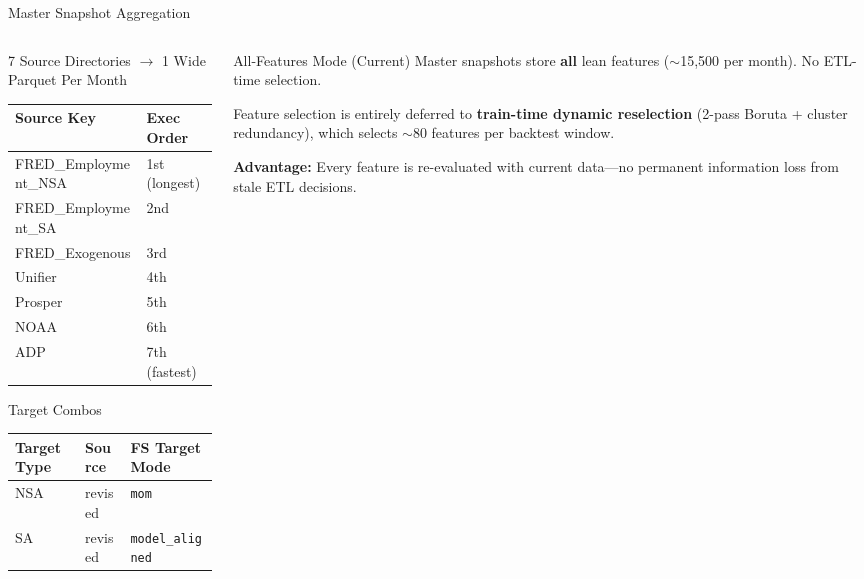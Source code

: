 \documentclass[aspectratio=169,10pt]{beamer}
\begin{document}
\begin{frame}{Master Snapshot Aggregation}
\begin{columns}[T]
\begin{column}{0.52\textwidth}
\begin{block}{7 Source Directories $\to$ 1 Wide Parquet Per Month}
\scriptsize
\begin{tabular}{@{}ll@{}}
\toprule
\textbf{Source Key} & \textbf{Exec Order} \\
\midrule
FRED\_Employment\_NSA & 1st (longest) \\
FRED\_Employment\_SA & 2nd \\
FRED\_Exogenous & 3rd \\
Unifier & 4th \\
Prosper & 5th \\
NOAA & 6th \\
ADP & 7th (fastest) \\
\bottomrule
\end{tabular}
\end{block}

\vspace{0.1cm}
\begin{block}{Target Combos}
\footnotesize
\begin{tabular}{@{}lll@{}}
\toprule
\textbf{Target Type} & \textbf{Source} & \textbf{FS Target Mode} \\
\midrule
NSA & revised & \texttt{mom} \\
SA & revised & \texttt{model\_aligned} \\
\bottomrule
\end{tabular}
\end{block}
\end{column}
\begin{column}{0.45\textwidth}
\begin{block}{All-Features Mode (Current)}
\footnotesize
Master snapshots store \textbf{all} lean features ($\sim$15{,}500 per month). No ETL-time selection.

\vspace{0.1cm}
Feature selection is entirely deferred to \textbf{train-time dynamic reselection} (2-pass Boruta + cluster redundancy), which selects $\sim$80 features per backtest window.

\vspace{0.1cm}
\textbf{Advantage:} Every feature is re-evaluated with current data---no permanent information loss from stale ETL decisions.
\end{block}


\end{column}
\end{columns}
\end{frame}
\end{document}
